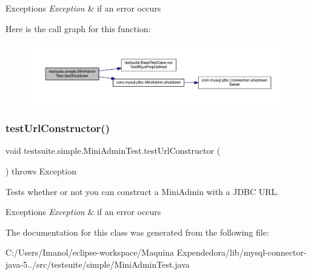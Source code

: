 \begin{DoxyExceptions}{Exceptions}
{\em Exception} & if an error occurs \\
\hline
\end{DoxyExceptions}
Here is the call graph for this function\+:
\nopagebreak
\begin{figure}[H]
\begin{center}
\leavevmode
\includegraphics[width=350pt]{classtestsuite_1_1simple_1_1_mini_admin_test_a8420a5f6bcd0ecfe1b716b8251899662_cgraph}
\end{center}
\end{figure}
\mbox{\label{classtestsuite_1_1simple_1_1_mini_admin_test_ae7432a2cbcda8109289d6240fb07839c}} 
\subsubsection{\texorpdfstring{test\+Url\+Constructor()}{testUrlConstructor()}}
{\footnotesize\ttfamily void testsuite.\+simple.\+Mini\+Admin\+Test.\+test\+Url\+Constructor (\begin{DoxyParamCaption}{ }\end{DoxyParamCaption}) throws Exception}

Tests whether or not you can construct a Mini\+Admin with a J\+D\+BC U\+RL.


\begin{DoxyExceptions}{Exceptions}
{\em Exception} & if an error occurs \\
\hline
\end{DoxyExceptions}


The documentation for this class was generated from the following file\+:\begin{DoxyCompactItemize}
\item 
C\+:/\+Users/\+Imanol/eclipse-\/workspace/\+Maquina Expendedora/lib/mysql-\/connector-\/java-\/5../src/testsuite/simple/Mini\+Admin\+Test.\+java\end{DoxyCompactItemize}

